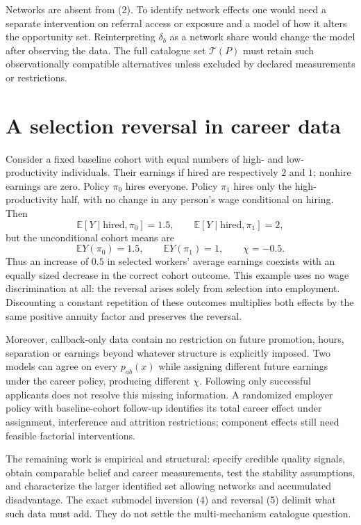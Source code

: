 \documentclass[11pt,a4paper]{article}
\newcommand{\E}{\mathbb E}
\begin{document}
Networks are absent from (2). To identify network effects one would need a separate intervention on referral access or exposure and a model of how it alters the opportunity set. Reinterpreting $\delta_b$ as a network share would change the model after observing the data. The full catalogue set $\mathcal T(P)$ must retain such observationally compatible alternatives unless excluded by declared measurements or restrictions.

\section{A selection reversal in career data}
Consider a fixed baseline cohort with equal numbers of high- and low-productivity individuals. Their earnings if hired are respectively $2$ and $1$; nonhire earnings are zero. Policy $\pi_0$ hires everyone. Policy $\pi_1$ hires only the high-productivity half, with no change in any person's wage conditional on hiring. Then
\[
 \E[Y\mid\text{hired},\pi_0]=1.5,\qquad
 \E[Y\mid\text{hired},\pi_1]=2,
\]
but the unconditional cohort means are
\[
 \E Y(\pi_0)=1.5,\qquad \E Y(\pi_1)=1,
 \qquad \chi=-0.5.                                  \tag{5}
\]
Thus an increase of $0.5$ in selected workers' average earnings coexists with an equally sized decrease in the correct cohort outcome. This example uses no wage discrimination at all: the reversal arises solely from selection into employment. Discounting a constant repetition of these outcomes multiplies both effects by the same positive annuity factor and preserves the reversal.

Moreover, callback-only data contain no restriction on future promotion, hours, separation or earnings beyond whatever structure is explicitly imposed. Two models can agree on every $p_{ab}(x)$ while assigning different future earnings under the career policy, producing different $\chi$. Following only successful applicants does not resolve this missing information. A randomized employer policy with baseline-cohort follow-up identifies its total career effect under assignment, interference and attrition restrictions; component effects still need feasible factorial interventions.

The remaining work is empirical and structural: specify credible quality signals, obtain comparable belief and career measurements, test the stability assumptions, and characterize the larger identified set allowing networks and accumulated disadvantage. The exact submodel inversion (4) and reversal (5) delimit what such data must add. They do not settle the multi-mechanism catalogue question.
\end{document}
